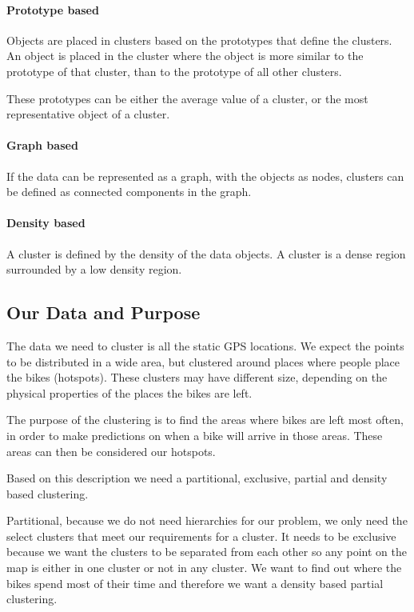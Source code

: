 \paragraph{Prototype based}
Objects are placed in clusters based on the prototypes that define the clusters.
An object is placed in the cluster where the object is more similar to the prototype of that cluster, than to the prototype of all other clusters.

These prototypes can be either the average value of a cluster, or the most representative object of a cluster.

\paragraph{Graph based}
If the data can be represented as a graph, with the objects as nodes, clusters can be defined as connected components in the graph.

\paragraph{Density based}
A cluster is defined by the density of the data objects.
A cluster is a dense region surrounded by a low density region.

\subsection{Our Data and Purpose}\label{data_purporse}
The data we need to cluster is all the static GPS locations.
We expect the points to be distributed in a wide area, but clustered around places where people place the bikes (hotspots).
These clusters may have different size, depending on the physical properties of the places the bikes are left.

The purpose of the clustering is to find the areas where bikes are left most often, in order to make predictions on when a bike will arrive in those areas.
These areas can then be considered our hotspots.

Based on this description we need a partitional, exclusive, partial and density based clustering.

Partitional, because we do not need hierarchies for our problem, we only need the select clusters that meet our requirements for a cluster.
It needs to be exclusive because we want the clusters to be separated from each other so any point on the map is either in one cluster or not in any cluster.
We want to find out where the bikes spend most of their time and therefore we want a density based partial clustering.

